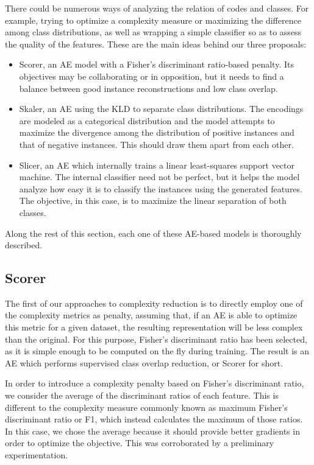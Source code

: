 \documentclass[
	fontsize=11pt, %
	twoside=false, %
	open=any, %
	secnumdepth=1, %
]{kaobook}
\begin{document}
There could be numerous ways of analyzing the relation of codes and classes. For example, trying to optimize a complexity measure or maximizing the difference among class distributions, as well as wrapping a simple classifier so as to assess the quality of the features. These are the main ideas behind our three proposals:
\begin{itemize}
  \item Scorer, an AE model with a Fisher's discriminant ratio-based penalty. Its objectives may be collaborating or in opposition, but it needs to find a balance between good instance reconstructions and low class overlap.
  \item Skaler, an AE using the KLD to separate class distributions. The encodings are modeled as a categorical distribution and the model attempts to maximize the divergence among the distribution of positive instances and that of negative instances. This should draw them apart from each other.
  \item Slicer, an AE which internally trains a linear least-squares support vector machine. The internal classifier need not be perfect, but it helps the model analyze how easy it is to classify the instances using the generated features. The objective, in this case, is to maximize the linear separation of both classes.
\end{itemize}
Along the rest of this section, each one of these AE-based models is thoroughly described.



\subsection{Scorer}


The first of our approaches to complexity reduction is to directly employ one of the complexity metrics as penalty, assuming that, if an AE is able to optimize this metric for a given dataset, the resulting representation will be less complex than the original. For this purpose, Fisher's discriminant ratio has been selected, as it is simple enough to be computed on the fly during training. The result is an AE which performs supervised class overlap reduction, or Scorer for short.

In order to introduce a complexity penalty based on Fisher's discriminant ratio, we consider the average of the discriminant ratios of each feature. This is different to the complexity measure commonly known as maximum Fisher's discriminant ratio or F1, which instead calculates the maximum of those ratios. In this case, we chose the average because it should provide better gradients in order to optimize the objective. This was corroborated by a preliminary experimentation.
\end{document}

